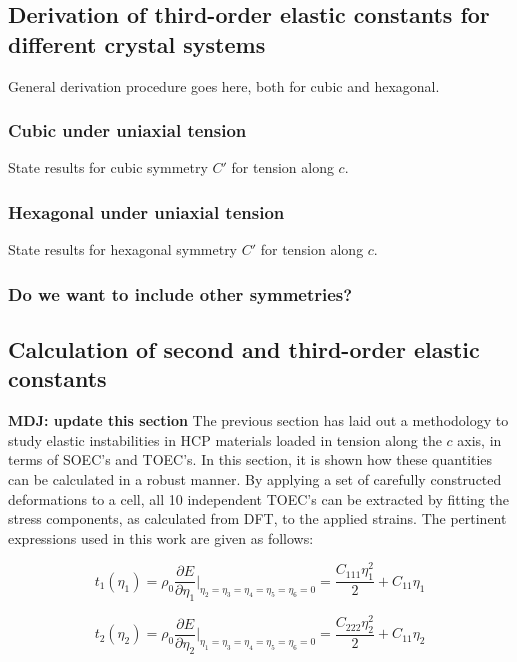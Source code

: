 \documentclass[showpacs,aps,floatfix,prb,reprint,superscriptaddress]{revtex4-1}
\begin{document}
\subsection{Derivation of third-order elastic constants for different crystal systems}
General derivation procedure goes here, both for cubic and hexagonal. 

\subsubsection{Cubic under uniaxial tension}
State results for cubic symmetry $C'$ for tension along $c$.

\subsubsection{Hexagonal under uniaxial tension}
State results for hexagonal symmetry $C'$ for tension along $c$.

\subsubsection{Do we want to include other symmetries?}

\subsection{Calculation of second and third-order elastic constants}
\textbf{MDJ: update this section}
The previous section has laid out a methodology to study elastic instabilities in HCP materials loaded in tension along the $c$ axis, in terms of SOEC's and TOEC's. In this section, it is shown how these quantities can be calculated in a robust manner.  By applying a set of carefully constructed deformations to a cell, all 10 independent TOEC's can be extracted by fitting the stress components, as calculated from DFT, to the applied strains. The pertinent expressions used in this work are given as follows:
\onecolumngrid

\begin{equation}
\label{eqn:s1} 
t_{1} \left(\eta_{1}\right) = \rho_{0} \frac{\partial E}{\partial \eta_{1}}\Bigr|_{\eta_2=\eta_3=\eta_4=\eta_5=\eta_6=0} = \frac{C_{111}\eta_{1}^2}{2} + C_{11}\eta_{1}
\end{equation}

\begin{equation}
\label{eqn:s2} 
t_{2} \left(\eta_{2}\right) = \rho_{0} \frac{\partial E}{\partial \eta_{2}}\Bigr|_{\eta_1=\eta_3=\eta_4=\eta_5=\eta_6=0} = \frac{C_{222}\eta_{2}^2}{2} + C_{11}\eta_{2}
\end{equation}
\end{document}
